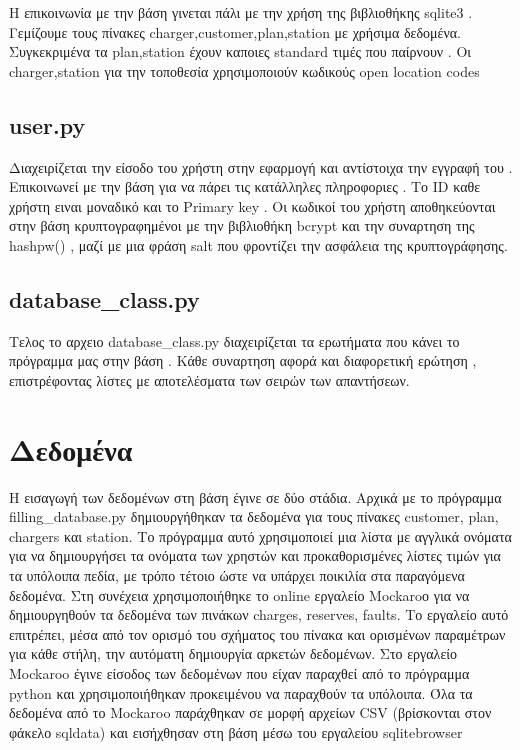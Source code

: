\documentclass[manuscript,screen,review]{acmart}
\newcommand{\en}[1]{\foreignlanguage{english}{#1}}
\begin{document}
 Η επικοινωνία με την βάση γινεται πάλι με την χρήση της βιβλιοθήκης sqlite3 . 
Γεμίζουμε τους πίνακες \en{charger,customer,plan,station} με χρήσιμα δεδομένα. Συγκεκριμένα τα \en{plan,station} έχουν καποιες \en{standard} τιμές που παίρνουν . Οι  \en{charger,station } για την τοποθεσία χρησιμοποιούν κωδικούς \en{open location codes }  

\subsection{\en{user.py}}

 Διαχειρίζεται την είσοδο του χρήστη στην εφαρμογή και αντίστοιχα την εγγραφή του . Επικοινωνεί με την βάση για να πάρει τις κατάλληλες πληροφοριες . Το \en{ID } καθε χρήστη ειναι μοναδικό και το \en{Primary key }. Οι κωδικοί του χρήστη αποθηκεύονται στην βάση κρυπτογραφημένοι με την βιβλιοθήκη \en{bcrypt} και την συναρτηση της \en{hashpw()} , μαζί με μια φράση \en{salt} που φροντίζει την ασφάλεια της κρυπτογράφησης. 

 


\subsection{\en{database\_class.py}}

 Τελος το αρχειο \en{database\_class.py} διαχειρίζεται τα ερωτήματα που κάνει το πρόγραμμα μας στην βάση . Κάθε συναρτηση αφορά και διαφορετική ερώτηση , επιστρέφοντας λίστες με αποτελέσματα των σειρών των απαντήσεων.

 

\newpage
\section{Δεδομένα}
\label{data}

Η εισαγωγή των δεδομένων στη βάση έγινε σε δύο στάδια. Αρχικά με το πρόγραμμα
\en{filling\_database.py} δημιουργήθηκαν τα δεδομένα για τους πίνακες \en{customer, plan, chargers}
και \en{station}. Το πρόγραμμα αυτό χρησιμοποιεί μια λίστα με αγγλικά ονόματα για να
δημιουργήσει τα ονόματα των χρηστών και προκαθορισμένες λίστες τιμών για τα υπόλοιπα
πεδία, με τρόπο τέτοιο ώστε να υπάρχει ποικιλία στα παραγόμενα δεδομένα. Στη συνέχεια
χρησιμοποιήθηκε το \en{online} εργαλείο \en{Mockaroο} για να δημιουργηθούν τα δεδομένα των πινάκων
\en{charges, reserves, faults}. Το εργαλείο αυτό επιτρέπει, μέσα από τον ορισμό του σχήματος
του πίνακα και ορισμένων παραμέτρων για κάθε στήλη, την αυτόματη δημιουργία αρκετών
δεδομένων. Στο εργαλείο \en{Mockaroo} έγινε είσοδος των δεδομένων που είχαν παραχθεί από το
πρόγραμμα \en{python} και χρησιμοποιήθηκαν προκειμένου να παραχθούν τα υπόλοιπα. Όλα τα
δεδομένα από το \en{Mockaroo} παράχθηκαν σε μορφή αρχείων \en{CSV} (βρίσκονται στον φάκελο \en{sqldata}) και εισήχθησαν στη βάση μέσω
του εργαλείου \en{sqlitebrowser}
\end{document}
